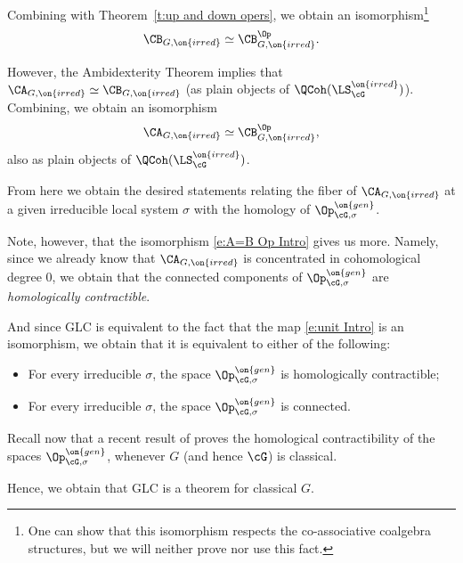 \documentclass[9pt]{amsart}
\theoremstyle{remark}
\theoremstyle{definition}
\theoremstyle{remark}
\newcommand{\thmref}[1]{Theorem~\ref{#1}}
\numberwithin{equation}{section}
\begin{document}
Combining with \thmref{t:up and down opers}, we obtain an isomorphism\footnote{One can show that this isomorphism respects the 
co-associative coalgebra structures, but we will neither prove nor use this fact.}  
$$\CB_{G,\on{irred}} \simeq \CB^{\Op}_{G,\on{irred}}.$$

\medskip

However, the Ambidexterity Theorem implies that $\CA_{G,\on{irred}}\simeq \CB_{G,\on{irred}}$ (as plain objects of $\QCoh(\LS^{\on{irred}}_\cG)$). 
Combining, we obtain an isomorphism
\begin{equation} \label{e:A=B Op Intro}
\CA_{G,\on{irred}}\simeq \CB^{\Op}_{G,\on{irred}},
\end{equation}
also as plain objects of $\QCoh(\LS^{\on{irred}}_\cG)$.

\medskip

From here we obtain the desired statements relating the fiber of $\CA_{G,\on{irred}}$ at a given irreducible local system $\sigma$
with the homology of $\Op^{\on{gen}}_{\cG,\sigma}$.  

\sssec{}

Note, however, that the isomorphism \eqref{e:A=B Op Intro} gives us more. Namely, since we already know that $\CA_{G,\on{irred}}$ is concentrated
in cohomological degree $0$, we obtain that the connected components of $\Op^{\on{gen}}_{\cG,\sigma}$ 
are \emph{homologically contractible}.

\medskip

And since GLC is equivalent to the fact that the map \eqref{e:unit Intro} is an isomorphism, we obtain that it is equivalent to either
of the following: 

\begin{itemize}

\item For every irreducible $\sigma$, the space $\Op^{\on{gen}}_{\cG,\sigma}$ is homologically contractible;

\item For every irreducible $\sigma$, the space $\Op^{\on{gen}}_{\cG,\sigma}$ is connected.

\end{itemize} 

\sssec{}

Recall now that a recent result of \cite{BKS} proves the homological contractibility of the spaces $\Op^{\on{gen}}_{\cG,\sigma}$,
whenever $G$ (and hence $\cG$) is classical.

\medskip

Hence, we obtain that GLC is a theorem for classical $G$. 
\end{document}
